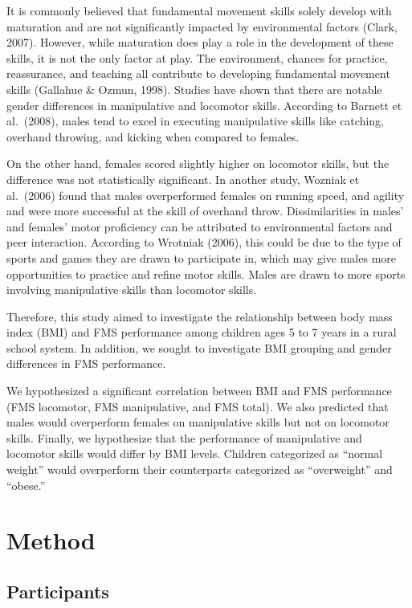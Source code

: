 \documentclass[
  jou,
  colorlinks=true,linkcolor=blue,citecolor=blue,urlcolor=blue]{apa7}
\begin{document}
It is commonly believed that fundamental movement skills solely develop
with maturation and are not significantly impacted by environmental
factors (Clark, 2007). However, while maturation does play a role in the
development of these skills, it is not the only factor at play. The
environment, chances for practice, reassurance, and teaching all
contribute to developing fundamental movement skills (Gallahue \& Ozmun,
1998). Studies have shown that there are notable gender differences in
manipulative and locomotor skills. According to Barnett et al.~(2008),
males tend to excel in executing manipulative skills like catching,
overhand throwing, and kicking when compared to females.

On the other hand, females scored slightly higher on locomotor skills,
but the difference was not statistically significant. In another study,
Wozniak et al.~(2006) found that males overperformed females on running
speed, and agility and were more successful at the skill of overhand
throw. Dissimilarities in males' and females' motor proficiency can be
attributed to environmental factors and peer interaction. According to
Wrotniak (2006), this could be due to the type of sports and games they
are drawn to participate in, which may give males more opportunities to
practice and refine motor skills. Males are drawn to more sports
involving manipulative skills than locomotor skills.

Therefore, this study aimed to investigate the relationship between body
mass index (BMI) and FMS performance among children ages 5 to 7 years in
a rural school system. In addition, we sought to investigate BMI
grouping and gender differences in FMS performance.

We hypothesized a significant correlation between BMI and FMS
performance (FMS locomotor, FMS manipulative, and FMS total). We also
predicted that males would overperform females on manipulative skills
but not on locomotor skills. Finally, we hypothesize that the
performance of manipulative and locomotor skills would differ by BMI
levels. Children categorized as ``normal weight'' would overperform
their counterparts categorized as ``overweight'' and ``obese.''

\hypertarget{method}{%
\section{Method}\label{method}}

\hypertarget{participants}{%
\subsection{Participants}\label{participants}}
\end{document}
